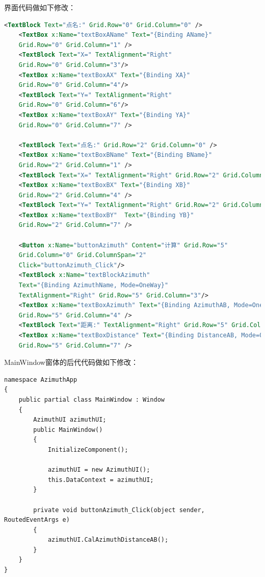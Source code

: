 界面代码做如下修改：
\begin{lstlisting}[language=XML]
    <TextBlock Text="点名:" Grid.Row="0" Grid.Column="0" />
    <TextBox x:Name="textBoxAName" Text="{Binding AName}" 
    Grid.Row="0" Grid.Column="1" />
    <TextBlock Text="X=" TextAlignment="Right"
    Grid.Row="0" Grid.Column="3"/>
    <TextBox x:Name="textBoxAX" Text="{Binding XA}" 
    Grid.Row="0" Grid.Column="4"/>
    <TextBlock Text="Y=" TextAlignment="Right" 
    Grid.Row="0" Grid.Column="6"/>
    <TextBox x:Name="textBoxAY" Text="{Binding YA}" 
    Grid.Row="0" Grid.Column="7" />
    
    <TextBlock Text="点名:" Grid.Row="2" Grid.Column="0" />
    <TextBox x:Name="textBoxBName" Text="{Binding BName}" 
    Grid.Row="2" Grid.Column="1" />
    <TextBlock Text="X=" TextAlignment="Right" Grid.Row="2" Grid.Column="3"/>
    <TextBox x:Name="textBoxBX" Text="{Binding XB}" 
    Grid.Row="2" Grid.Column="4" />
    <TextBlock Text="Y=" TextAlignment="Right" Grid.Row="2" Grid.Column="6"/>
    <TextBox x:Name="textBoxBY"  Text="{Binding YB}" 
    Grid.Row="2" Grid.Column="7" />
    
    <Button x:Name="buttonAzimuth" Content="计算" Grid.Row="5" 
    Grid.Column="0" Grid.ColumnSpan="2"
    Click="buttonAzimuth_Click"/>
    <TextBlock x:Name="textBlockAzimuth" 
    Text="{Binding AzimuthName, Mode=OneWay}" 
    TextAlignment="Right" Grid.Row="5" Grid.Column="3"/>
    <TextBox x:Name="textBoxAzimuth" Text="{Binding AzimuthAB, Mode=OneWay}" 
    Grid.Row="5" Grid.Column="4" />
    <TextBlock Text="距离:" TextAlignment="Right" Grid.Row="5" Grid.Column="6" />
    <TextBox x:Name="textBoxDistance" Text="{Binding DistanceAB, Mode=OneWay}"
    Grid.Row="5" Grid.Column="7" />
\end{lstlisting}

MainWindow窗体的后代代码做如下修改：

\begin{lstlisting}
namespace AzimuthApp
{
    public partial class MainWindow : Window
    {
        AzimuthUI azimuthUI;
        public MainWindow()
        {
            InitializeComponent();
            
            azimuthUI = new AzimuthUI();
            this.DataContext = azimuthUI;
        }
        
        private void buttonAzimuth_Click(object sender, RoutedEventArgs e)
        {
            azimuthUI.CalAzimuthDistanceAB();
        }
    }
}
\end{lstlisting}